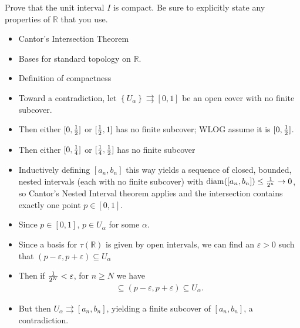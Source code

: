 \begin{problem}[Fall 2005]

Prove that the unit interval \(I\) is compact. Be sure to explicitly
state any properties of \({\mathbb{R}}\) that you use.

\end{problem}

\begin{solution}

\envlist

\begin{concept}

\envlist

\begin{itemize}
\tightlist
\item
  Cantor's Intersection Theorem
\item
  Bases for standard topology on \({\mathbb{R}}\).
\item
  Definition of compactness
\end{itemize}

\end{concept}

\begin{itemize}
\tightlist
\item
  Toward a contradiction, let
  \(\left\{{U_\alpha}\right\} \rightrightarrows[0, 1]\) be an open cover
  with no finite subcover.
\item
  Then either \([0, {1\over 2}]\) or \([{1\over 2}, 1]\) has no finite
  subcover; WLOG assume it is \([0, {1\over 2}]\).
\item
  Then either \([0, {1\over 4}]\) or \([{1\over 4}, {1\over 2}]\) has no
  finite subcover
\item
  Inductively defining \([a_n, b_n]\) this way yields a sequence of
  closed, bounded, nested intervals (each with no finite subcover) with
  \({\operatorname{diam}}([a_n, b_n]) \leq {1 \over 2^n} \to 0\), so
  Cantor's Nested Interval theorem applies and the intersection contains
  exactly one point \(p \in [0, 1]\).
\item
  Since \(p\in [0, 1]\), \(p\in U_\alpha\) for some \(\alpha\).
\item
  Since a basis for \(\tau({\mathbb{R}})\) is given by open intervals,
  we can find an \(\varepsilon>0\) such that
  \((p-\varepsilon, p+\varepsilon) \subseteq U_\alpha\)
\item
  Then if \({1\over 2^N} < \varepsilon\), for \(n\geq N\) we have
  \begin{align*}[a_n, b_n] \subseteq (p-\varepsilon, p+\varepsilon) \subseteq U_\alpha.\end{align*}
\item
  But then \(U_\alpha \rightrightarrows[a_n, b_n]\), yielding a finite
  subcover of \([a_n, b_n]\), a contradiction.
\end{itemize}

\end{solution}

